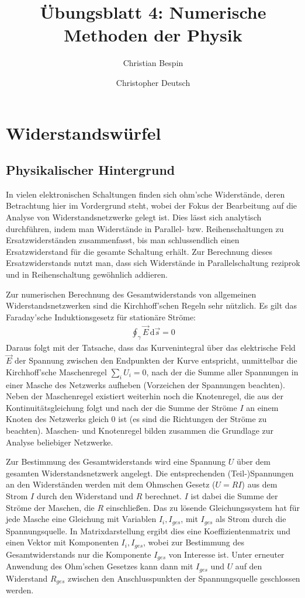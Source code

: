 \documentclass[10pt,a4paper]{article}
\author{Christian Bespin \and Christopher Deutsch}
\title{Übungsblatt 4: Numerische Methoden der Physik}
\begin{document}
\maketitle

\setcounter{section}{3}

\section{Widerstandswürfel}

\subsection{Physikalischer Hintergrund}

In vielen elektronischen Schaltungen finden sich ohm'sche Widerstände, deren Betrachtung hier im Vordergrund steht, wobei der Fokus der Bearbeitung auf die Analyse von Widerstandsnetzwerke gelegt ist. Dies lässt sich analytisch durchführen, indem man Widerstände in Parallel- bzw. Reihenschaltungen zu Ersatzwiderständen zusammenfasst, bis man schlussendlich einen Ersatzwiderstand für die gesamte Schaltung erhält. Zur Berechnung dieses Ersatzwiderstands nutzt man, dass sich Widerstände in Parallelschaltung reziprok und in Reihenschaltung gewöhnlich addieren.

Zur numerischen Berechnung des Gesamtwiderstands von allgemeinen Widerstandsnetzwerken sind die Kirchhoff'schen Regeln sehr nützlich. Es gilt das Faraday'sche Induktionsgesetz für stationäre Ströme:
\begin{align}
\oint_{\gamma} \vec{E}\,\mathrm{d}\vec{s} = 0
\end{align}
Daraus folgt mit der Tatsache, dass das Kurvenintegral über das elektrische Feld $\vec{E}$ der Spannung zwischen den Endpunkten der Kurve entspricht, unmittelbar die Kirchhoff'sche Maschenregel $\sum_i U_i=0$, nach der die Summe aller Spannungen in einer Masche des Netzwerks aufheben (Vorzeichen der Spannungen beachten).
Neben der Maschenregel existiert weiterhin noch die Knotenregel, die aus der Kontinuitätsgleichung folgt und nach der die Summe der Ströme $I$ an einem Knoten des Netzwerks gleich $0$ ist (es sind die Richtungen der Ströme zu beachten). Maschen- und Knotenregel bilden zusammen die Grundlage zur Analyse beliebiger Netzwerke.

Zur Bestimmung des Gesamtwiderstands wird eine Spannung $U$ über dem gesamten Widerstandsnetzwerk angelegt. Die entsprechenden (Teil-)Spannungen an den Widerständen werden mit dem Ohmschen Gesetz ($U=R I$) aus dem Strom $I$ durch den Widerstand und $R$ berechnet. $I$ ist dabei die Summe der Ströme der Maschen, die $R$ einschließen. Das zu lösende Gleichungssystem hat für jede Masche eine Gleichung mit Variablen $I_i, I_{ges}$, mit $I_{ges}$ als Strom durch die Spannungsquelle. In Matrixdarstellung ergibt dies eine Koeffizientenmatrix und einen Vektor mit Komponenten $I_i, I_{ges}$, wobei zur Bestimmung des Gesamtwiderstands nur die Komponente $I_{ges}$ von Interesse ist. Unter erneuter Anwendung des Ohm'schen Gesetzes kann dann mit $I_{ges}$ und $U$ auf den Widerstand $R_{ges}$ zwischen den Anschlusspunkten der Spannungsquelle geschlossen werden.
\end{document}
